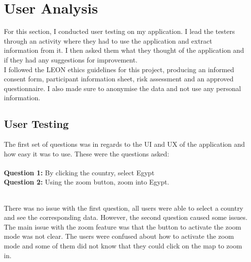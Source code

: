 \documentclass{report}
\begin{document}
\chapter{User Analysis}
For this section, I conducted user testing on my application. I lead the testers through an activity where they had to use the application and extract information from it. I then asked them what they thought of the application and if they had any suggestions for improvement.\\

I followed the LEON ethics guidelines for this project, producing an informed consent form, participant information sheet, risk assessment and an approved questionnaire. I also made sure to anonymise the data and not use any personal information.
\section{User Testing}
The first set of questions was in regards to the UI and UX of the application and how easy it was to use. These were the questions asked:\\ \\
\textbf{Question 1: }By clicking the country, select Egypt\\
\textbf{Question 2: }Using the zoom button, zoom into Egypt.\\

\noindent
\begin{minipage}[t]{0.45\textwidth}
    \centering
\end{minipage}
\hfill
\begin{minipage}[t]{0.45\textwidth}
    \centering
\end{minipage}
\newline
\\There was no issue with the first question, all users were able to select a country and see the corresponding data. However, the second question caused some issues. The main issue with the zoom feature was that the button to activate the zoom mode was not clear. The users were confused about how to activate the zoom mode and some of them did not know that they could click on the map to zoom in.\\
\end{document}
